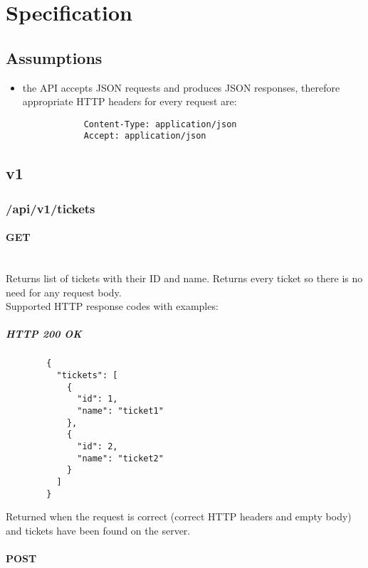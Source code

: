 \documentclass[a4paper]{article}
\newcommand{\newLineParagraph}[1]{\paragraph{#1}\mbox{}\\}
\begin{document}
    \section{Specification}

    \subsection{Assumptions}
    \begin{itemize}
        \item the API accepts JSON requests and produces JSON responses, therefore appropriate HTTP headers for every request are:
        \begin{verbatim}
            Content-Type: application/json
            Accept: application/json
        \end{verbatim}
    \end{itemize}

    \subsection{v1}
    \subsubsection{/api/v1/tickets}
    \newLineParagraph{GET}
    Returns list of tickets with their ID and name. Returns every ticket so there is no need for any request body. \\
    Supported HTTP response codes with examples:
    \subparagraph{HTTP 200 OK}
    \begin{verbatim}
        {
          "tickets": [
            {
              "id": 1,
              "name": "ticket1"
            },
            {
              "id": 2,
              "name": "ticket2"
            }
          ]
        }
    \end{verbatim}
    Returned when the request is correct (correct HTTP headers and empty body) and tickets have been found on the server.

    \newLineParagraph{POST}
\end{document}

